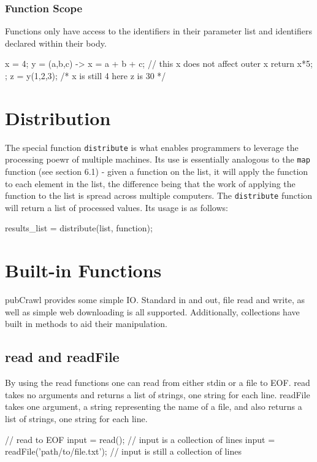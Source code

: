 \documentclass[oneside]{book}
\begin{document}
\subsubsection{Function Scope}

Functions only have access to the identifiers in their parameter list and identifiers declared within their body.
\begin{mdframed}
[hidealllines=true,backgroundcolor=gray!10,skipbelow=.5em,skipabove=.5em]
\begin{code}
x = 4;
y = (a,b,c) -> 
{
  x = a + b + c; // this x does not affect outer x
  return x*5;
};
z = y(1,2,3);
/* 
  x is still 4 here
  z is 30
*/
\end{code}
\end{mdframed}

\section{Distribution}
The special function \texttt{distribute} is what enables programmers to leverage the processing poewr of multiple machines. Its use is essentially analogous to the \texttt{map} function (see section 6.1) - given a function on the list, it will apply the function to each element in the list, the difference being that the work of applying the function to the list is spread across multiple computers. The  \texttt{distribute} function will return a list of processed values. Its usage is as follows:

\begin{mdframed}[hidealllines=true,backgroundcolor=gray!10,skipbelow=.5em,skipabove=.5em]
\begin{code}
results_list = distribute(list, function);
\end{code}
\end{mdframed}


\section{Built-in Functions}
pubCrawl provides some simple IO. Standard in and out, file read and write, as well as simple web downloading is all supported. Additionally, collections have built in methods to aid their manipulation.
\subsection{read and readFile}
By using the read functions one can read from either stdin or a file to EOF. read takes no arguments and returns a list of strings, one string for each line. readFile takes one argument, a string representing the name of a file, and also returns a list of strings, one string for each line.
\begin{mdframed}[hidealllines=true,backgroundcolor=gray!10,skipbelow=.5em,skipabove=.5em]
\begin{code}
// read to EOF
input = read(); // input is a collection of lines
input = readFile('path/to/file.txt'); // input is still a collection of lines
\end{code}
\end{mdframed}
\end{document}
